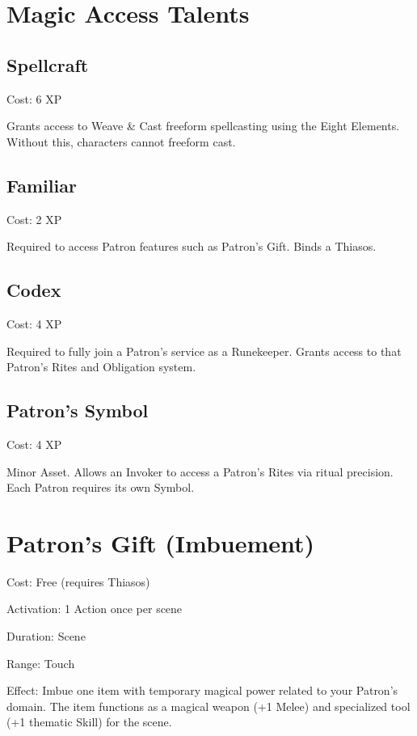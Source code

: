 \documentclass[11pt,twoside,openany]{book}
\begin{document}
\section*{Magic Access Talents} 

\subsection*{Spellcraft}

Cost: 6 XP

Grants access to Weave \& Cast freeform spellcasting using the Eight Elements. Without this, characters cannot freeform cast.

\subsection*{Familiar}

Cost: 2 XP

Required to access Patron features such as Patron's Gift. Binds a Thiasos.

\subsection*{Codex}

Cost: 4 XP

Required to fully join a Patron's service as a Runekeeper. Grants access to that Patron's Rites and Obligation system.

\subsection*{Patron's Symbol}

Cost: 4 XP

Minor Asset. Allows an Invoker to access a Patron's Rites via ritual precision. Each Patron requires its own Symbol.

\section*{Patron's Gift (Imbuement)} 

Cost: Free (requires Thiasos)

Activation: 1 Action once per scene

Duration: Scene

Range: Touch

Effect: Imbue one item with temporary magical power related to your Patron's domain. The item functions as a magical weapon (+1 Melee) and specialized tool (+1 thematic Skill) for the scene.
\end{document}
